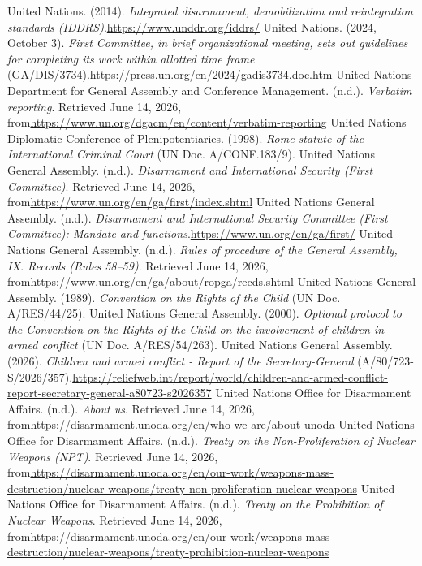 \begin{referencelist}
   United Nations. (2014). \emph{Integrated disarmament, demobilization and reintegration standards (IDDRS)}.\url{https://www.unddr.org/iddrs/}
   United Nations. (2024, October 3). \emph{First Committee, in brief organizational meeting, sets out guidelines for completing its work within allotted time frame} (GA/DIS/3734).\url{https://press.un.org/en/2024/gadis3734.doc.htm}
   United Nations Department for General Assembly and Conference Management. (n.d.). \emph{Verbatim reporting}. Retrieved June 14, 2026, from\url{https://www.un.org/dgacm/en/content/verbatim-reporting}
   United Nations Diplomatic Conference of Plenipotentiaries. (1998). \emph{Rome statute of the International Criminal Court} (UN Doc. A/CONF.183/9).
   United Nations General Assembly. (n.d.). \emph{Disarmament and International Security (First Committee)}. Retrieved June 14, 2026, from\url{https://www.un.org/en/ga/first/index.shtml}
   United Nations General Assembly. (n.d.). \emph{Disarmament and International Security Committee (First Committee): Mandate and functions}.\url{https://www.un.org/en/ga/first/}
   United Nations General Assembly. (n.d.). \emph{Rules of procedure of the General Assembly, IX. Records (Rules 58–59)}. Retrieved June 14, 2026, from\url{https://www.un.org/en/ga/about/ropga/recds.shtml}
   United Nations General Assembly. (1989). \emph{Convention on the Rights of the Child} (UN Doc. A/RES/44/25).
   United Nations General Assembly. (2000). \emph{Optional protocol to the Convention on the Rights of the Child on the involvement of children in armed conflict} (UN Doc. A/RES/54/263).
   United Nations General Assembly. (2026). \emph{Children and armed conflict - Report of the Secretary-General} (A/80/723-S/2026/357).\url{https://reliefweb.int/report/world/children-and-armed-conflict-report-secretary-general-a80723-s2026357}
   United Nations Office for Disarmament Affairs. (n.d.). \emph{About us}. Retrieved June 14, 2026, from\url{https://disarmament.unoda.org/en/who-we-are/about-unoda}
   United Nations Office for Disarmament Affairs. (n.d.). \emph{Treaty on the Non-Proliferation of Nuclear Weapons (NPT)}. Retrieved June 14, 2026, from\url{https://disarmament.unoda.org/en/our-work/weapons-mass-destruction/nuclear-weapons/treaty-non-proliferation-nuclear-weapons}
   United Nations Office for Disarmament Affairs. (n.d.). \emph{Treaty on the Prohibition of Nuclear Weapons}. Retrieved June 14, 2026, from\url{https://disarmament.unoda.org/en/our-work/weapons-mass-destruction/nuclear-weapons/treaty-prohibition-nuclear-weapons}

\end{referencelist}
